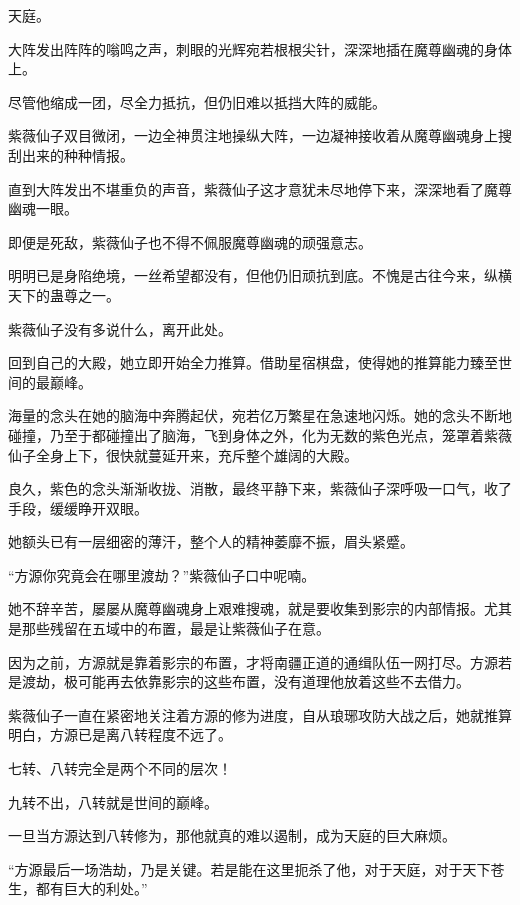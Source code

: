 
\begin{this_body}

天庭。

大阵发出阵阵的嗡鸣之声，刺眼的光辉宛若根根尖针，深深地插在魔尊幽魂的身体上。

尽管他缩成一团，尽全力抵抗，但仍旧难以抵挡大阵的威能。

紫薇仙子双目微闭，一边全神贯注地操纵大阵，一边凝神接收着从魔尊幽魂身上搜刮出来的种种情报。

直到大阵发出不堪重负的声音，紫薇仙子这才意犹未尽地停下来，深深地看了魔尊幽魂一眼。

即便是死敌，紫薇仙子也不得不佩服魔尊幽魂的顽强意志。

明明已是身陷绝境，一丝希望都没有，但他仍旧顽抗到底。不愧是古往今来，纵横天下的蛊尊之一。

紫薇仙子没有多说什么，离开此处。

回到自己的大殿，她立即开始全力推算。借助星宿棋盘，使得她的推算能力臻至世间的最巅峰。

海量的念头在她的脑海中奔腾起伏，宛若亿万繁星在急速地闪烁。她的念头不断地碰撞，乃至于都碰撞出了脑海，飞到身体之外，化为无数的紫色光点，笼罩着紫薇仙子全身上下，很快就蔓延开来，充斥整个雄阔的大殿。

良久，紫色的念头渐渐收拢、消散，最终平静下来，紫薇仙子深呼吸一口气，收了手段，缓缓睁开双眼。

她额头已有一层细密的薄汗，整个人的精神萎靡不振，眉头紧蹙。

“方源你究竟会在哪里渡劫？”紫薇仙子口中呢喃。

她不辞辛苦，屡屡从魔尊幽魂身上艰难搜魂，就是要收集到影宗的内部情报。尤其是那些残留在五域中的布置，最是让紫薇仙子在意。

因为之前，方源就是靠着影宗的布置，才将南疆正道的通缉队伍一网打尽。方源若是渡劫，极可能再去依靠影宗的这些布置，没有道理他放着这些不去借力。

紫薇仙子一直在紧密地关注着方源的修为进度，自从琅琊攻防大战之后，她就推算明白，方源已是离八转程度不远了。

七转、八转完全是两个不同的层次！

九转不出，八转就是世间的巅峰。

一旦当方源达到八转修为，那他就真的难以遏制，成为天庭的巨大麻烦。

“方源最后一场浩劫，乃是关键。若是能在这里扼杀了他，对于天庭，对于天下苍生，都有巨大的利处。”


\end{this_body}

